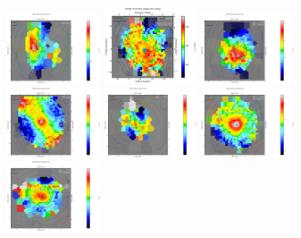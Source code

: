 \begin{figure}
      \centering
      \includegraphics[width=0.245\textwidth]{Vmaps/ngc0612_stellar_sigma.png}
      \includegraphics[width=0.245\textwidth]{Vmaps/ngc3557_stellar_sigma.png}
      \includegraphics[width=0.245\textwidth]{Vmaps/ngc3100_stellar_sigma.png}
      \includegraphics[width=0.245\textwidth]{Vmaps/ic1459_stellar_sigma.png}
      \includegraphics[width=0.245\textwidth]{Vmaps/pks0718-34_stellar_sigma.png}
      \includegraphics[width=0.245\textwidth]{Vmaps/ic4296_stellar_sigma.png}
      \includegraphics[width=0.245\textwidth]{Vmaps/ngc7075_stellar_sigma.png}

\end{figure}
